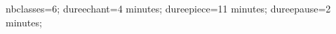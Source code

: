 \documentclass[exercice]{thedocument}%
\begin{document}
%
    \>nbclasses=6;%
    \>dureechant=4 minutes;%
    \>dureepiece=11 minutes;%
    \>dureepause=2 minutes;%
\end{document}
